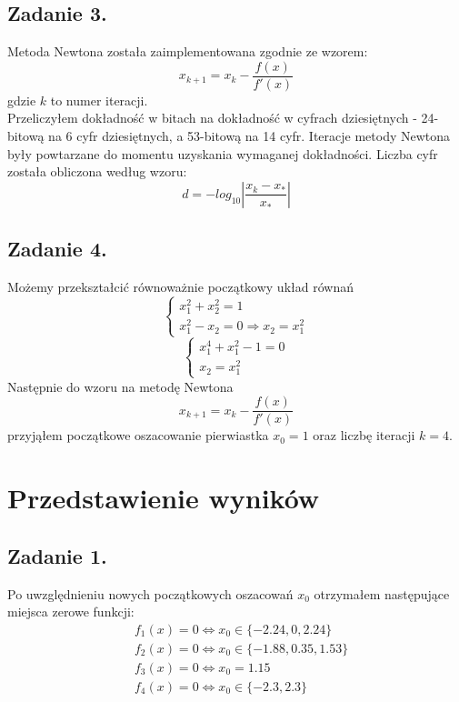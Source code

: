 \documentclass[11pt, leqno]{scrartcl}
\begin{document}
    \subsection{Zadanie 3.}
    Metoda Newtona została zaimplementowana zgodnie ze
    wzorem:
    \[
        x_{k+1}=x_k-\frac{f(x)}{f'(x)}
    \]
    gdzie $k$ to numer iteracji. \\
    Przeliczyłem dokładność w bitach na dokładność w cyfrach
    dziesiętnych - 24-bitową na 6 cyfr dziesiętnych,
    a 53-bitową na 14 cyfr. Iteracje metody Newtona były
    powtarzane do momentu uzyskania wymaganej dokładności.
    Liczba cyfr została obliczona według wzoru:
    \[
        d=-log_{10}\left| \frac{x_k-x_*}{x_*} \right|
    \]

    \subsection{Zadanie 4.}
    Możemy przekształcić równoważnie początkowy układ równań
    \[
        \begin{cases}
            x_1^2+x_2^2 = 1 \\
            x_1^2-x_2 = 0 \Rightarrow x_2=x_1^2
        \end{cases}
    \]
    \[
        \begin{cases}
            x_1^4+x_1^2-1=0 \\
            x_2=x_1^2
        \end{cases}
    \]
    Następnie do wzoru na metodę Newtona
    \[
        x_{k+1}=x_k-\frac{f(x)}{f'(x)}
    \]
    przyjąłem początkowe oszacowanie pierwiastka $x_0=1$
    oraz liczbę iteracji $k=4$.

    \section{Przedstawienie wyników}
    \subsection{Zadanie 1.}
    Po uwzględnieniu nowych początkowych oszacowań $x_0$
    otrzymałem następujące miejsca zerowe funkcji:
    \begin{align*}
        &f_1(x)=0 \Leftrightarrow x_0\in \{-2.24,0,2.24\} \\
        &f_2(x)=0 \Leftrightarrow x_0\in \{-1.88,0.35,1.53\} \\
        &f_3(x)=0 \Leftrightarrow x_0=1.15 \\
        &f_4(x)=0 \Leftrightarrow x_0\in \{-2.3,2.3\}
    \end{align*}
\end{document}
